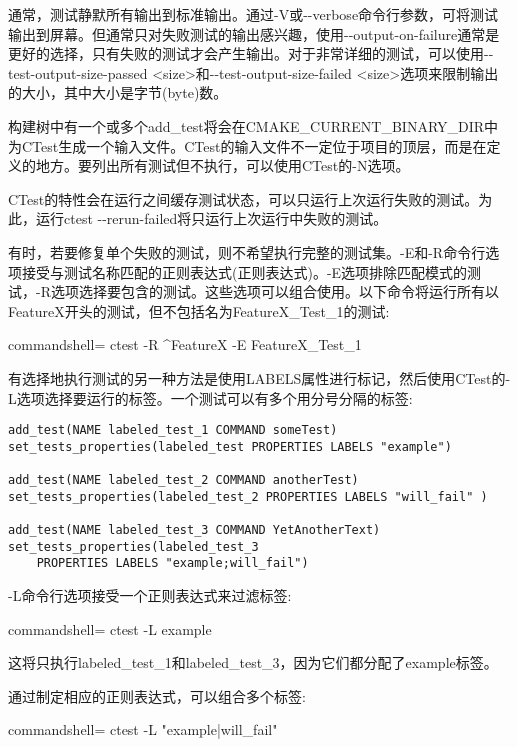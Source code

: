 通常，测试静默所有输出到标准输出。通过-V或-{}-verbose命令行参数，可将测试输出到屏幕。但通常只对失败测试的输出感兴趣，使用-{}-output-on-failure通常是更好的选择，只有失败的测试才会产生输出。对于非常详细的测试，可以使用-{}-test-output-size-passed <size>和-{}-test-output-size-failed <size>选项来限制输出的大小，其中大小是字节(byte)数。

构建树中有一个或多个add\_test将会在CMAKE\_CURRENT\_BINARY\_DIR中为CTest生成一个输入文件。CTest的输入文件不一定位于项目的顶层，而是在定义的地方。要列出所有测试但不执行，可以使用CTest的-N选项。

CTest的特性会在运行之间缓存测试状态，可以只运行上次运行失败的测试。为此，运行ctest -{}-rerun-failed将只运行上次运行中失败的测试。

有时，若要修复单个失败的测试，则不希望执行完整的测试集。-E和-R命令行选项接受与测试名称匹配的正则表达式(正则表达式)。-E选项排除匹配模式的测试，-R选项选择要包含的测试。这些选项可以组合使用。以下命令将运行所有以FeatureX开头的测试，但不包括名为FeatureX\_Test\_1的测试:

\begin{tcblisting}{commandshell={}}
ctest -R ^FeatureX -E FeatureX_Test_1
\end{tcblisting}

有选择地执行测试的另一种方法是使用LABELS属性进行标记，然后使用CTest的-L选项选择要运行的标签。一个测试可以有多个用分号分隔的标签:

\begin{lstlisting}[style=styleCMake]
add_test(NAME labeled_test_1 COMMAND someTest)
set_tests_properties(labeled_test PROPERTIES LABELS "example")

add_test(NAME labeled_test_2 COMMAND anotherTest)
set_tests_properties(labeled_test_2 PROPERTIES LABELS "will_fail" )

add_test(NAME labeled_test_3 COMMAND YetAnotherText)
set_tests_properties(labeled_test_3
	PROPERTIES LABELS "example;will_fail")
\end{lstlisting}

-L命令行选项接受一个正则表达式来过滤标签:

\begin{tcblisting}{commandshell={}}
ctest -L example
\end{tcblisting}

这将只执行labeled\_test\_1和labeled\_test\_3，因为它们都分配了example标签。

通过制定相应的正则表达式，可以组合多个标签:

\begin{tcblisting}{commandshell={}}
ctest -L "example|will_fail"
\end{tcblisting}

